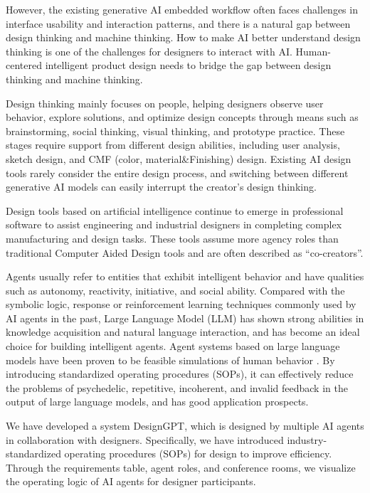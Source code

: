 \documentclass[10pt, conference, compsocconf]{IEEEtran}
\begin{document}
However, the existing generative AI embedded workflow often faces challenges in interface usability and interaction patterns, and there is a natural gap between design thinking and machine thinking. How to make AI better understand design thinking is one of the challenges for designers to interact with AI. Human-centered intelligent product design needs to bridge the gap between design thinking and machine thinking\cite{6sun}.

Design thinking mainly focuses on people, helping designers observe user behavior, explore solutions, and optimize design concepts through means such as brainstorming, social thinking, visual thinking, and prototype practice. These stages require support from different design abilities, including user analysis, sketch design, and CMF (color, material\&Finishing) design. Existing AI design tools rarely consider the entire design process, and switching between different generative AI models can easily interrupt the creator's design thinking.

Design tools based on artificial intelligence continue to emerge in professional software to assist engineering and industrial designers in completing complex manufacturing and design tasks. These tools assume more agency roles than traditional Computer Aided Design tools and are often described as “co-creators”\cite{wang2020human}.

Agents usually refer to entities that exhibit intelligent behavior and have qualities such as autonomy, reactivity, initiative, and social ability\cite{wooldridge1995intelligent}. Compared with the symbolic logic, response or reinforcement learning techniques commonly used by AI agents in the past, Large Language Model (LLM) has shown strong abilities in knowledge acquisition and natural language interaction\cite{GPT4}, and has become an ideal choice for building intelligent agents. Agent\cite{torantulino2023auto-gpt} systems based on large language models have been proven to be feasible simulations of human behavior \cite{li2023camel}\cite{3park}. By introducing standardized operating procedures (SOPs)\cite{4metagpt}, it can effectively reduce the problems of psychedelic, repetitive, incoherent, and invalid feedback in the output of large language models, and has good application prospects\cite{qian2023chatdev}.

We have developed a system DesignGPT, which is designed by multiple AI agents in collaboration with designers. Specifically, we have introduced industry-standardized operating procedures (SOPs) for design to improve efficiency. Through the requirements table, agent roles, and conference rooms, we visualize the operating logic of AI agents for designer participants.
\end{document}
